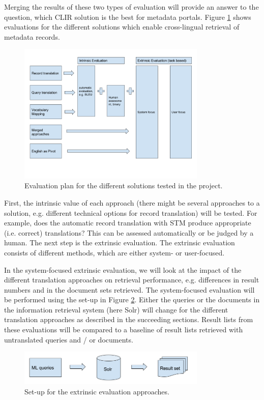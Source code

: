 \documentclass[a4paper,11pt]{article}
\begin{document}
Merging the results of these two types of evaluation will provide an answer to the question, which CLIR solution is the best for metadata portals. Figure \ref{fig1} shows evaluations for the different solutions which enable cross-lingual retrieval of metadata records.  
\begin{figure}[h]
	\centering
  \includegraphics[width=0.8\textwidth]{./img/overview_evaluation.png}
	\caption{Evaluation plan for the different solutions tested in the project.}
	\label{fig1}
\end{figure}

First, the intrinsic value of each approach (there might be several approaches to a solution, e.g. different technical options for record translation) will be tested. For example, does the automatic record translation with STM produce appropriate (i.e. correct) translations? This can be assessed automatically or be judged by a human. The next step is the extrinsic evaluation. The extrinsic evaluation consists of different methods, which are either system- or user-focused.

In the system-focused extrinsic evaluation, we will look at the impact of the different translation approaches on retrieval performance, e.g. differences in result numbers and in the document sets retrieved. The system-focused evaluation will be performed using the set-up in Figure \ref{fig2}. Either the queries or the documents in the information retrieval system (here Solr) will change for the different translation approaches as described in the succeeding sections. Result lists from these evaluations will be compared to a baseline of result lists retrieved with untranslated queries and / or documents.

\begin{figure}[h]
	\centering
  \includegraphics[width=0.8\textwidth]{./img/Info_sys.png}
	\caption{Set-up for the extrinsic evaluation approaches.}
	\label{fig2}
\end{figure}
\end{document}
